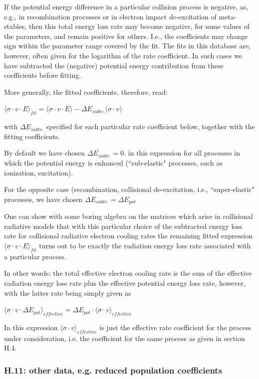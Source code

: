 \documentclass[12pt,dvips]{article}
\begin{document}
If the potential energy difference in a particular collision process
is negative, as, e.g., in recombination processes
or in electron impact de-excitation of meta-stables,
then this total energy loss rate
may become negative, for some values of the parameters,
and remain positive for others.
I.e., the coefficients may change sign within the parameter
range covered by the fit.
The fits in this database are, however, often given for the logarithm of the
rate coefficient. In such cases we have subtracted the (negative) potential energy
contribution from these coefficients before fitting.

More generally, the fitted coefficients, therefore, read:

$\langle\sigma \cdot v \cdot E \rangle_{fit} = \langle\sigma \cdot v \cdot E \rangle - \Delta E_{subtr.} \langle\sigma \cdot v \rangle$

with $\Delta E_{subtr.} $ specified for each particular rate coefficient below, together
with the fitting coefficients.

By default we have chosen $\Delta E_{subtr.} = 0.$ in this expression
for all processes in which the potential energy is
enhanced (``sub-elastic" processes, such as ionization, excitation).

For the opposite case (recombination, collisional de-excitation, i.e., ``super-elastic"
processes, we have chosen $\Delta E_{subtr.} = \Delta E_{pot}$

One can show with some boring algebra on the matrices which arise in collisional radiative
models that
with this particular choice of the subtracted energy loss rate for collisional radiative
electron cooling rates
the remaining fitted expression $\langle\sigma \cdot v \cdot E \rangle_{fit}$
turns out to be exactly the radiation energy loss rate
associated with a particular process.

In other words: the total effective electron cooling rate
is the sum of the effective
radiation energy loss rate
plus the effective potential energy loss rate, however, with the latter rate being simply
given as

$\langle\sigma \cdot v \cdot \Delta E_{pot} \rangle_{effective} = \Delta E_{pot}
\cdot \langle\sigma \cdot v \rangle_{effective}$

In this expression $\langle\sigma \cdot v \rangle_{effective}$
is just the effective rate coefficient
for the process under consideration, i.e. the coefficient for the same process as given
in section H.4.
\newpage
\subsubsection*{H.11: other data, e.g. reduced population coefficients}
\end{document}
